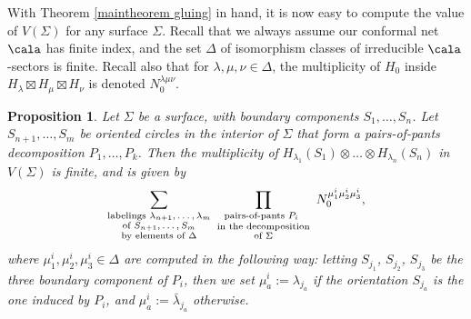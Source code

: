 \documentclass[a4paper,10pt,leqno]{amsart}
\theoremstyle{plain}
\newtheorem{proposition}[theorem]{Proposition}
\theoremstyle{definition}
\theoremstyle{remark}
\begin{document}
With Theorem \ref{maintheorem gluing} in hand, it is now easy to compute the value of $V(\Sigma)$ for any surface $\Sigma$.
Recall that we always assume our conformal net $\cala$ has finite index, and the set $\Delta$ of isomorphism classes of irreducible $\cala$-sectors is finite.
Recall also that for $\lambda,\mu,\nu\in \Delta$, the multiplicity of $H_0$ inside $H_\lambda\boxtimes H_\mu\boxtimes H_\nu$ is denoted $N_0^{\lambda\mu\nu}$.

\begin{proposition}\label{prop: Conf Blocks 1}
Let $\Sigma$ be a surface, with boundary components $S_1,\ldots,S_n$.
Let $S_{n+1},\ldots,S_m$ be oriented circles in the interior of $\Sigma$ that form a pairs-of-pants decomposition $P_1,\ldots,P_k$.
Then the multiplicity of $H_{\lambda_1}(S_1)\otimes \ldots \otimes H_{\lambda_n}(S_n)$ in $V(\Sigma)$ is finite, and is given by
\begin{equation}\label{eq: state sum + labelings}
\raisebox{.15cm}{$\displaystyle\sum_{\substack{\text{labelings $\lambda_{n+1},\ldots,\lambda_m$}\\\text{of $S_{n+1},\ldots,S_m$}\\\text{by elements of $\Delta$}}}
\,\,\prod_{\substack{\text{pairs-of-pants $P_i{}_{\phantom{(}}$}\\\text{in the decomposition}\\\text{of $\Sigma$}}}
\,\,N_0^{\mu_1^i\mu_2^i\mu_3^i},
$}\end{equation}
where $\mu_1^i,\mu_2^i,\mu_3^i\in\Delta$ are computed in the following way:
letting $S_{j_1}$, $S_{j_2}$, $S_{j_3}$ be the three boundary component of $P_i$, then we set
$\mu_a^i:=\lambda_{j_a}$ if the orientation $S_{j_a}$ is the one induced by $P_i$,
and $\mu_a^i:=\bar \lambda_{j_a}$ otherwise.
\end{proposition}
\end{document}
